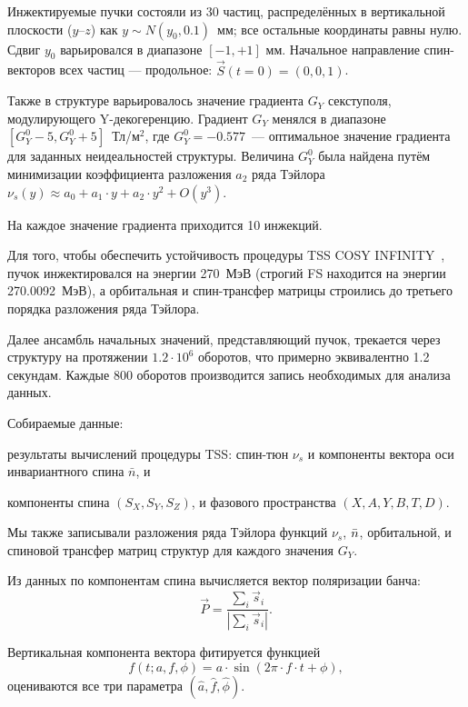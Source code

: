 Инжектируемые пучки состояли из 30 частиц, распределённых в вертикальной
плоскости ($y$--$z$) как ${y\sim N(y_0, 0.1)}$~мм; все остальные координаты равны нулю.
Сдвиг $y_0$ варьировался в диапазоне ${[-1, +1]}$ мм. Начальное
направление спин-векторов всех частиц --- продольное: ${\vec S(t=0) = (0,0,1)}$.

Также в структуре варьировалось значение градиента $G_Y$ секступоля,
модулирующего Y-декогеренцию. Градиент $G_Y$ менялся в
диапазоне ${[G_Y^0 - 5, G_Y^0 + 5]}$~Тл/м$^2$, где
${G_Y^0=-0.577}$~\Tlmsq --- оптимальное значение градиента для заданных 
неидеальностей структуры. Величина $G_Y^0$ была найдена путём минимизации коэффициента разложения $a_2$
ряда Тэйлора ${\nu_s(y) \approx a_0 + a_1\cdot y + a_2\cdot y^2 + O(y^3)}$.

На каждое значение градиента приходится 10 инжекций.

Для того, чтобы обеспечить устойчивость процедуры TSS COSY INFINITY~\cite{COSYINF:Manual:BeamPhys}, пучок инжектировался на энергии 270~МэВ (строгий FS находится на энергии 270.0092~МэВ), а 
орбитальная и спин-трансфер матрицы  строились до третьего порядка разложения ряда Тэйлора. 

Далее ансамбль начальных значений, представляющий пучок, трекается
через структуру на протяжении $1.2\cdot10^6$ оборотов, что
примерно эквивалентно 1.2 секундам. Каждые 800 оборотов производится
запись необходимых для анализа данных.

Собираемые данные: 
\begin{enumerate*}
	\item результаты вычислений процедуры TSS: спин-тюн $\nu_s$ и компоненты вектора оси инвариантного спина $\bar n$, и
	\item компоненты спина $(S_X, S_Y, S_Z)$, и фазового пространства $(X,A,Y,B,T,D)$.
\end{enumerate*}
Мы также записывали разложения ряда Тэйлора функций $\nu_s$, $\bar n$, орбитальной, и спиновой трансфер матриц
структур для каждого значения $G_Y$.

Из данных по компонентам спина вычисляется вектор поляризации банча:
\begin{equation}\label{eq:polarization_formula}
\vec P = \frac{\sum_i\vec s_i}{|\sum_i\vec s_i|}.
\end{equation}

Вертикальная компонента вектора фитируется функцией 
\[
{f(t; a,f,\phi) = a\cdot \sin(2\pi\cdot f\cdot t + \phi)},
\]
оцениваются все три параметра 
${(\hat a, \hat f, \hat\phi)}$. 


